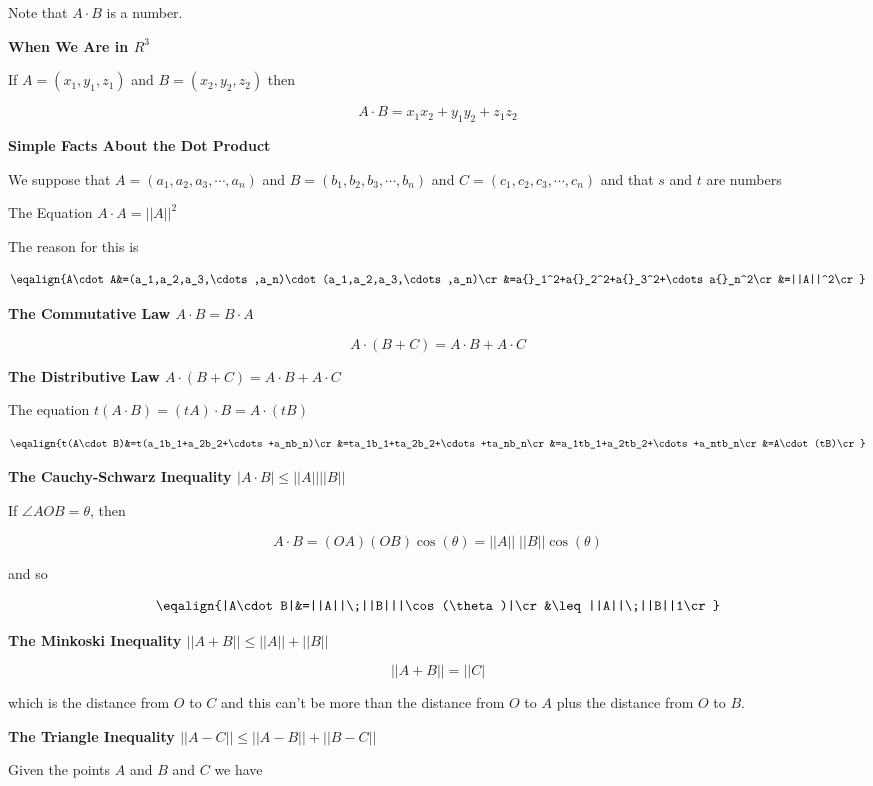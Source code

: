 Note that $A\cdot B$ is a number.

\vskip 1mm
{\bf When We Are in $R^3$}

\vskip 1mm
If $A=(x_1,y_1,z_1)$ and $B=(x_2,y_2,z_2)$ then

$$A\cdot B=x_1x_2+y_1y_2+z_1z_2$$

\filbreak
\vskip 1cm
{\bf Simple Facts About the Dot Product}

\vskip 1mm
We suppose that $A=(a_1,a_2,a_3,\cdots,a_n)$ and $B=(b_1,b_2,b_3,\cdots,b_n)$ and $C=(c_1,c_2,c_3,\cdots,c_n)$ and that $s$ and $t$ are numbers

\vskip 1mm
The Equation $A\cdot A=||A||^2$

\vskip 1mm
The reason for this is

$$\eqalign{A\cdot A&=(a_1,a_2,a_3,\cdots,a_n)\cdot(a_1,a_2,a_3,\cdots,a_n)\cr
		&=a{}_1^2+a{}_2^2+a{}_3^2+\cdots a{}_n^2\cr
		&=||A||^2\cr}$$

\filbreak
\vskip 1cm
{\bf The Commutative Law $A\cdot B=B\cdot A$}

$$A\cdot(B+C)=A\cdot B+A\cdot C$$

\filbreak
\vskip 1cm
{\bf The Distributive Law $A\cdot(B+C)=A\cdot B+A\cdot C$}

\filbreak
\vskip 1cm
The equation $t(A\cdot B)=(tA)\cdot B= A\cdot (tB)$

$$\eqalign{t(A\cdot B)&=t(a_1b_1+a_2b_2+\cdots+a_nb_n)\cr
		&=ta_1b_1+ta_2b_2+\cdots+ta_nb_n\cr
		&=a_1tb_1+a_2tb_2+\cdots+a_ntb_n\cr
		&=A\cdot(tB)\cr}$$

\filbreak
\vskip 1cm
{\bf The Cauchy-Schwarz Inequality $|A\cdot B|\leq||A||||B||$}

\vskip 1mm
If $\angle AOB=\theta$, then

$$A\cdot B=(OA)(OB)\cos(\theta)=||A||\;||B||\cos(\theta)$$

and so

$$\eqalign{|A\cdot B|&=||A||\;||B|||\cos(\theta)|\cr
			&\leq ||A||\;||B||1\cr}$$

\filbreak
\vskip 1cm
{\bf The Minkoski Inequality $||A+B||\leq||A||+||B||$}

$$||A+B||=||C|$$

which is the distance from $O$ to $C$ and this can't be more than the distance from $O$ to $A$ plus the distance from $O$ to $B$.

\filbreak
\vskip 1cm
{\bf The Triangle Inequality $||A-C||\leq||A-B||+||B-C||$}

\vskip 1mm
Given the points $A$ and $B$ and $C$ we have

